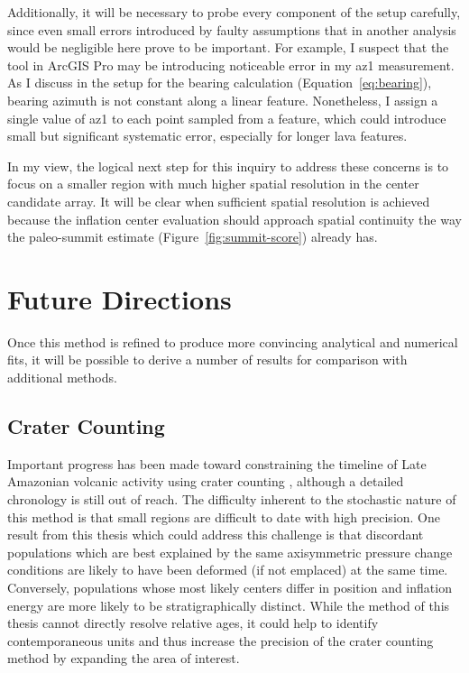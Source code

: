 Additionally, it will be necessary to probe every component of the setup carefully, since even small errors introduced by faulty assumptions that in another analysis would be negligible here prove to be important. For example, I suspect that the  tool in ArcGIS Pro may be introducing noticeable error in my \acl{az1} measurement. As I discuss in the setup for the \acs{bearing} calculation (Equation~\eqref{eq:bearing}), bearing azimuth is not constant along a linear feature. Nonetheless, I assign a single value of \acs{az1} to each point sampled from a feature, which could introduce small but significant systematic error, especially for longer lava features.

In my view, the logical next step for this inquiry to address these concerns is to focus on a smaller region with much higher spatial resolution in the center candidate array. It will be clear when sufficient spatial resolution is achieved because the inflation center evaluation should approach spatial continuity the way the paleo-summit estimate (Figure~\ref{fig:summit-score}) already has.

\section{Future Directions}

Once this method is refined to produce more convincing analytical and numerical fits, it will be possible to derive a number of results for comparison with additional methods.

\subsection{Crater Counting}
Important progress has been made toward constraining the timeline of Late Amazonian volcanic activity using crater counting \parencite{kneissl_map-projection-independent_2011,robbins_volcanic_2011,
robbins_large_2013,
platz_crater-based_2013}, although a detailed chronology is still out of reach. The difficulty inherent to the stochastic nature of this method is that small regions are difficult to date with high precision. One result from this thesis which could address this challenge is that discordant populations which are best explained by the same axisymmetric pressure change conditions are likely to have been deformed (if not emplaced) at the same time. Conversely, populations whose most likely centers differ in position and inflation energy are more likely to be stratigraphically distinct. While the method of this thesis cannot directly resolve relative ages, it could help to identify contemporaneous units and thus increase the precision of the crater counting method by expanding the area of interest.

